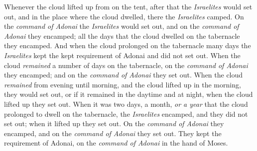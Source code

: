 \begin{biblechapter}
\verse Whenever the cloud lifted up from on the tent, after that the \textit{Israelites} would set out, and in the place where the cloud dwelled, there the \textit{Israelites} camped.
\verse On the \textit{command of Adonai} the \textit{Israelites} would set out, and on the \textit{command of Adonai} they encamped; all the days that the cloud dwelled on the tabernacle they encamped.
\verse And when the cloud prolonged on the tabernacle many days the \textit{Israelites} kept the kept requirement of Adonai and did not set out.
\verse When the cloud \textit{remained} a number of days on the tabernacle, on the \textit{command of Adonai} they encamped; and on the \textit{command of Adonai} they set out.
\verse When the cloud \textit{remained} from evening until morning, and the cloud lifted up in the morning, they would set out, or if it remained in the daytime and at night, when the cloud lifted up they set out.
\verse When it was two days, a month, \textit{or a year} that the cloud prolonged to dwell on the tabernacle, the \textit{Israelites} encamped, and they did not set out; when it lifted up they set out.
\verse On the \textit{command of Adonai} they encamped, and on the \textit{command of Adonai} they set out. They kept the requirement of Adonai, on the \textit{command of Adonai} in the hand of Moses.
\end{biblechapter}

